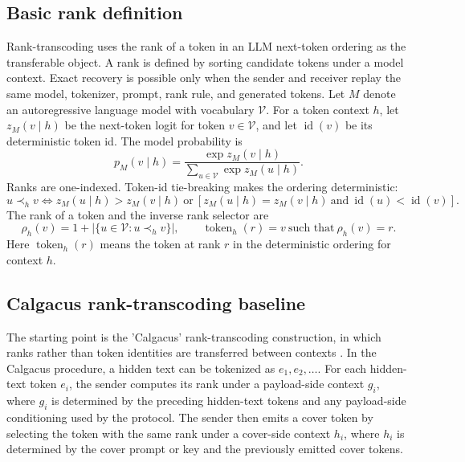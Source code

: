 \documentclass[fleqn,10pt]{wlscirep}
\begin{document}
\subsection*{Basic rank definition}

Rank-transcoding uses the rank of a token in an LLM next-token ordering as the transferable object. A rank is defined by sorting candidate tokens under a model context. Exact recovery is possible only when the sender and receiver replay the same model, tokenizer, prompt, rank rule, and generated tokens.
Let \(M\) denote an autoregressive language model with vocabulary \(\mathcal{V}\). For a token context \(h\), let \(z_M(v\mid h)\) be the next-token logit for token \(v\in\mathcal{V}\), and let \(\operatorname{id}(v)\) be its deterministic token id. The model probability is
\begin{equation}
p_M(v\mid h)=
\frac{\exp z_M(v\mid h)}
{\sum_{u\in\mathcal V}\exp z_M(u\mid h)}.
\label{eq:next-token-prob}
\end{equation}
Ranks are one-indexed. Token-id tie-breaking makes the ordering deterministic:
\begin{equation}
u \prec_h v
\Longleftrightarrow
z_M(u\mid h)>z_M(v\mid h)
\ \text{or}\
\left[z_M(u\mid h)=z_M(v\mid h)\ \text{and}\ \operatorname{id}(u)<\operatorname{id}(v)\right].
\label{eq:rank-order}
\end{equation}
The rank of a token and the inverse rank selector are
\begin{equation}
\rho_h(v)=1+\left|\{u\in\mathcal V:u\prec_h v\}\right|,
\qquad
\operatorname{token}_h(r)=v\ \text{such that}\ \rho_h(v)=r.
\label{eq:rank-function}
\end{equation}
Here \(\operatorname{token}_h(r)\) means the token at rank \(r\) in the deterministic ordering for context \(h\).


\subsection*{Calgacus rank-transcoding baseline}

The starting point is the 'Calgacus' rank-transcoding construction, in which ranks rather than token identities are transferred between contexts \cite{NorelliBronstein2025Calgacus}. In the Calgacus procedure, a hidden text can be tokenized as \(e_1,e_2,\ldots\). For each hidden-text token \(e_i\), the sender computes its rank under a payload-side context \(g_i\), where \(g_i\) is determined by the preceding hidden-text tokens and any payload-side conditioning used by the protocol. The sender then emits a cover token by selecting the token with the same rank under a cover-side context \(h_i\), where \(h_i\) is determined by the cover prompt or key and the previously emitted cover tokens.
\end{document}

